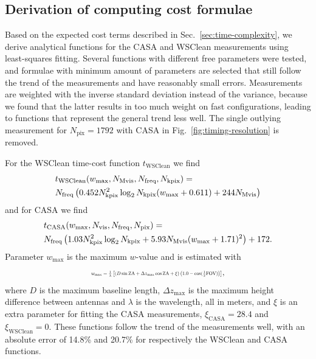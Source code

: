 \documentclass[useAMS,usenatbib]{mn2e}
\begin{document}

\subsection{Derivation of computing cost formulae}
Based on the expected cost terms described in Sec.~\ref{sec:time-complexity}, we derive analytical functions for the CASA and WSClean measurements using least-squares fitting. Several functions with different free parameters were tested, and formulae with minimum amount of parameters are selected that still follow the trend of the measurements and have reasonably small errors. Measurements are weighted with the inverse standard deviation instead of the variance, because we found that the latter results in too much weight on fast configurations, leading to functions that represent the general trend less well. The single outlying measurement for $N_\textrm{pix}=1792$ with CASA in Fig.~\ref{fig:timing-resolution} is removed.

For the WSClean time-cost function $t_\textrm{WSClean}$ we find 
\begin{align}\label{eq:wsclean-computing-cost}
& t_\textrm{WSClean} (w_{\max},N_\textrm{Mvis},N_\textrm{freq},N_\textrm{kpix}) = \\ \notag%
& N_\textrm{freq} \left( 0.452 N_\textrm{kpix}^2 \log_2 N_\textrm{kpix} (w_{\max} + 0.611) + 244 N_\textrm{Mvis} \right)
\end{align}
and for CASA we find
\begin{align}\label{eq:casa-computing-cost}
& t_\textrm{CASA}(w_{\max},N_\textrm{vis},N_\textrm{freq},N_\textrm{pix}) = \\ \notag%
& N_\textrm{freq} \left(1.03 N_\textrm{kpix}^2 \log_2 N_\textrm{kpix} + 5.93 N_\textrm{Mvis} (w_{\max} + 1.71)^2\right) + 172.
\label{eq:casa-computing-cost}%
\end{align}
Parameter $w_{\max}$ is the maximum $w$-value and is estimated with
\begin{equation}\resizebox{0.45\textwidth}{!}{$
 w_{\max} = \frac{1}{\lambda}\left[(D \sin \textrm{ZA} + \Delta z_{\max} \cos \textrm{ZA} + \xi) \left(1.0 - \cos(\frac{1}{2}\textrm{FOV})\right)\right]$},
\end{equation}%
where $D$ is the maximum baseline length, $\Delta z_{\max}$ is the maximum height difference between antennas and $\lambda$ is the wavelength, all in meters, and $\xi$ is an extra parameter for fitting the CASA measurements, $\xi_\textrm{CASA}=28.4$ and $\xi_\textrm{WSClean}=0$. These functions follow the trend of the measurements well, with an absolute error of 14.8\% and 20.7\% for respectively the WSClean and CASA functions.
\end{document}
